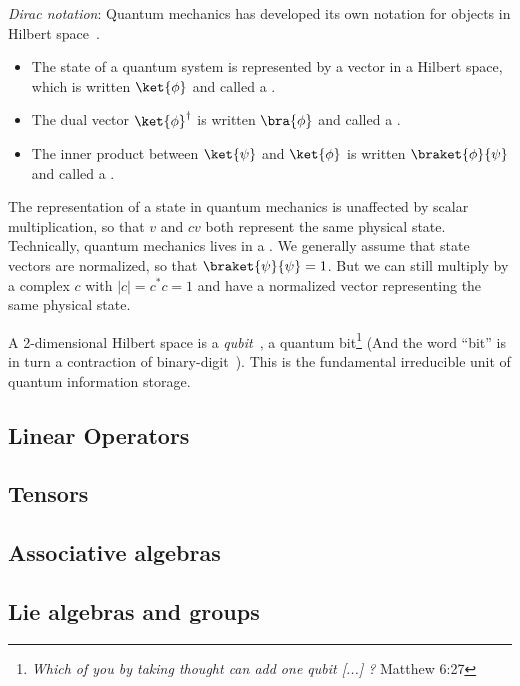 {\sl Dirac notation}: Quantum mechanics has developed its own notation for objects in Hilbert space~\cite{Dirac1939a}. 
 \begin{itemize}
 \item The state of a quantum system is represented by a vector in a Hilbert space, which is written $\ket{\phi}$ and called a .
  \item The dual vector $\ket{\phi}^\dagger$  is written $\bra{\phi}$ and called a .
  \item The inner product between $\ket{\psi}$ and $\ket{\phi}$ is written $\braket{\phi}{\psi}$ and called a .
 \end{itemize}
The representation of a state in quantum mechanics is unaffected by scalar multiplication, so that $v$ and $cv$ both represent the same physical state. Technically, quantum mechanics  lives in a . We generally assume that state vectors are normalized, so that $\braket{\psi}{\psi}=1$. But we can still multiply by a complex  $c$ with $|c| = c^*c = 1$ and have a  normalized vector representing the same physical state.  

A 2-dimensional Hilbert space is a {\sl qubit}~\cite{???}, a quantum bit\footnote{{\sl
Which of you by taking thought can add one qubit [...] ?} Matthew 6:27} (And the word ``bit'' is in turn a contraction of binary-digit~\cite{Shannon1948a}). This is the fundamental irreducible unit of quantum information storage.


\subsection{Linear Operators}


\subsection{Tensors}


\subsection{Associative algebras}



\subsection{Lie algebras and groups}




